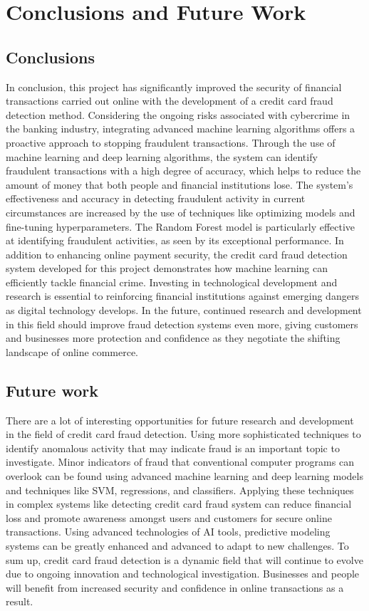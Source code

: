 \chapter{Conclusions and Future Work}
\label{ch:con}
\section{Conclusions}
In conclusion, this project has significantly improved the security of financial transactions carried out online with the development of a credit card fraud detection method. Considering the ongoing risks associated with cybercrime in the banking industry, integrating advanced machine learning algorithms offers a proactive approach to stopping fraudulent transactions. Through the use of machine learning and deep learning algorithms, the system can identify fraudulent transactions with a high degree of accuracy, which helps to reduce the amount of money that both people and financial institutions lose. The system's effectiveness and accuracy in detecting fraudulent activity in current circumstances are increased by the use of techniques like optimizing models and fine-tuning hyperparameters. The Random Forest model is particularly effective at identifying fraudulent activities, as seen by its exceptional performance. In addition to enhancing online payment security, the credit card fraud detection system developed for this project demonstrates how machine learning can efficiently tackle financial crime. Investing in technological development and research is essential to reinforcing financial institutions against emerging dangers as digital technology develops. In the future, continued research and development in this field should improve fraud detection systems even more, giving customers and businesses more protection and confidence as they negotiate the shifting landscape of online commerce.

 

\section{Future work}
There are a lot of interesting opportunities for future research and development in the field of credit card fraud detection. Using more sophisticated techniques to identify anomalous activity that may indicate fraud is an important topic to investigate. Minor indicators of fraud that conventional computer programs can overlook can be found using advanced machine learning and deep learning models and techniques like SVM, regressions, and classifiers. Applying these techniques in complex systems like detecting credit card fraud system can reduce financial loss and promote awareness amongst users and customers for secure online transactions. Using advanced technologies of AI tools, predictive modeling systems can be greatly enhanced and advanced to adapt to new challenges. To sum up, credit card fraud detection is a dynamic field that will continue to evolve due to ongoing innovation and technological investigation. Businesses and people will benefit from increased security and confidence in online transactions as a result. 